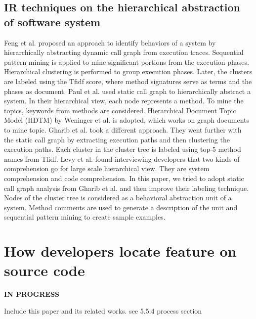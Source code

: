 \subsection{IR techniques on the hierarchical abstraction of software system}
Feng et al. \cite{feng2018hierarchicalExecutionComprehension} proposed an approach to identify behaviors of a system by hierarchically abstracting dynamic call graph from execution traces. Sequential pattern mining is applied to mine significant portions from the execution phases. Hierarchical clustering is performed to group execution phases. Later, the clusters are labeled using the Tfidf score, where method signatures serve as terms and the phases as document. 
Paul et al. \cite{mcburney2014improvingTopicSummarize} used static call graph to hierarchically abstract a system. In their hierarchical view, each node represents a method. To mine the topics, keywords from methods are considered. Hierarchical Document Topic Model (HDTM) by \cite{weninger2012documentTopicHierarchies} Weninger et al. is adopted, which works on graph documents to mine topic. Gharib et al. \cite{gharibi2018automaticStaticCluster} took a different approach. They went further with the static call graph by extracting execution paths and then clustering the execution paths. Each cluster in the cluster tree is labeled using top-5 method names from Tfidf. Levy et al. \cite{levy2019understandingLargeHierarchical} found interviewing developers that two kinds of comprehension go for large scale hierarchical view. They are system comprehension and code comprehension. In this paper, we tried to adopt static call graph analysis from Gharib et al. and then improve their labeling technique. Nodes of the cluster tree is considered as a behavioral abstraction unit of a system. Method comments are used to generate a description of the unit and sequential pattern mining to create sample examples. 

\section{How developers locate feature on source code}
\label{related:feature_locate}
\textbf{IN PROGRESS}

Include this paper and its related works. \cite{damevski2016field} \cite{kruger2019features} see 5.5.4 process section 